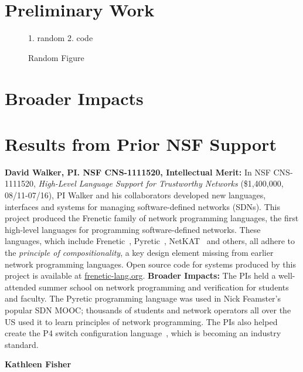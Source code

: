 \section{Preliminary Work}
\label{sec:preliminary}

\begin{figure}[t]
    \begin{minipage}{0.5\textwidth}
        \centering
\begin{mylisting}
 1. random
 2. code
\end{mylisting}
        \caption{Random Figure}
        \label{fig:random}
    \end{minipage}
\end{figure}


\section{Broader Impacts}
\label{sec:impact}


\section{Results from Prior NSF Support}
\label{sec:prior-support}

\noindent
{\bf David Walker, PI. NSF CNS-1111520, Intellectual Merit:}
In NSF CNS-1111520, \emph{High-Level Language Support for Trustworthy Networks}
(\$1,400,000, 08/11-07/16),
PI Walker and his collaborators developed new languages, interfaces
and systems for managing software-defined networks (SDNs).  
This project produced the Frenetic family
of network programming languages, the first high-level languages for
programming software-defined networks.  These languages, which include
Frenetic~\cite{frenetic}, 
Pyretic~\cite{pyretic},
NetKAT~\cite{netkat} and others, all adhere to the
\emph{principle of compositionality}, a key design element missing
from earlier network programming languages.  
Open source code for systems produced by this project is available
at \url{frenetic-lang.org}.
%
{\bf Broader Impacts:} 
The PIs held a well-attended summer school on network programming and 
verification for students and faculty. The
Pyretic programming language was used in Nick Feamster's popular
SDN MOOC; thousands of students and
network operators all over the US used it to learn principles of network
programming.  The PIs
also helped create the P4 switch configuration language~\cite{P4}, which is
becoming an industry standard.

\medskip
\noindent
{\bf Kathleen Fisher} 

